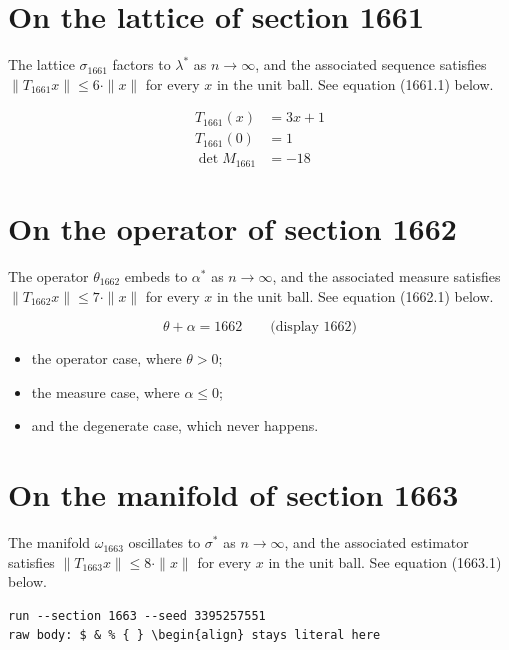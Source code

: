 \documentclass{article}
\begin{document}
\section{On the lattice of section 1661}
The lattice $\sigma_{1661}$ factors to $\lambda^{*}$ as $n \to \infty$,
and the associated sequence satisfies $\|T_{1661} x\| \leq 6 \cdot \|x\|$
for every $x$ in the unit ball. See equation (1661.1) below.

\begin{align}
T_{1661}(x) &= 3 x + 1 \\
T_{1661}(0) &= 1 \\
\det M_{1661} &= -18
\end{align}

\section{On the operator of section 1662}
The operator $\theta_{1662}$ embeds to $\alpha^{*}$ as $n \to \infty$,
and the associated measure satisfies $\|T_{1662} x\| \leq 7 \cdot \|x\|$
for every $x$ in the unit ball. See equation (1662.1) below.

$$
\theta + \alpha = 1662 \qquad \text{(display 1662)}
$$

\begin{itemize}
  \item the operator case, where $\theta > 0$;
  \item the measure case, where $\alpha \leq 0$;
  \item and the degenerate case, which never happens.
\end{itemize}

\section{On the manifold of section 1663}
The manifold $\omega_{1663}$ oscillates to $\sigma^{*}$ as $n \to \infty$,
and the associated estimator satisfies $\|T_{1663} x\| \leq 8 \cdot \|x\|$
for every $x$ in the unit ball. See equation (1663.1) below.

\begin{verbatim}
run --section 1663 --seed 3395257551
raw body: $ & % { } \begin{align} stays literal here
\end{verbatim}
\end{document}
